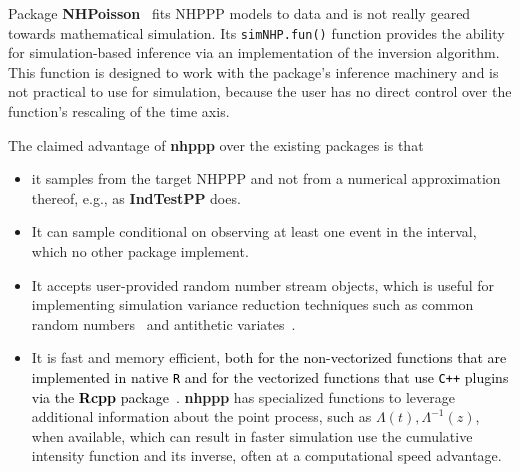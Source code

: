 \documentclass[10pt,letterpaper]{article}
\newcommand{\pkg}[1]{{\bf #1}}
\newcommand{\proglang}[1]{\texttt{#1}}
\newcommand{\fct}[1]{\texttt{#1()}}
\newcommand{\red}[1]{\textcolor{black}{#1}}
\begin{document}
Package \pkg{NHPoisson}~\cite{NHPoisson-jss, NHPoisson-package} fits NHPPP models to data and is not really geared towards mathematical simulation. Its \fct{simNHP.fun} function provides the ability for simulation-based inference via an implementation of the inversion algorithm. This function is designed to work with the package's inference machinery and is not practical to use for simulation, because the user has no direct control over the function's rescaling of the time axis.

The claimed advantage of \pkg{nhppp} over the existing packages is that
\begin{itemize}
\item it samples from the target NHPPP and not from a numerical approximation thereof, e.g., as \pkg{IndTestPP} does.
\item It can  sample conditional on observing at least one event in the interval, which no other package implement.
\item It accepts user-provided random number stream objects, which is useful for implementing simulation variance reduction techniques such as common random numbers~\cite{wright1979crn} and antithetic variates~\cite{hammersley1956av}.
\item It is fast and memory efficient, \red{both for the non-vectorized functions that are implemented in native \proglang{R} and for the vectorized functions that use \proglang{C++} plugins via the \pkg{Rcpp} package~\cite{rcpp-package}.} \pkg{nhppp} has specialized functions to leverage additional information about the point process, such as $\Lambda(t), \Lambda^{-1}(z)$, when available, which can result in faster simulation  use the cumulative intensity function and its inverse, often at a computational speed advantage. 
\end{itemize}
\end{document}
